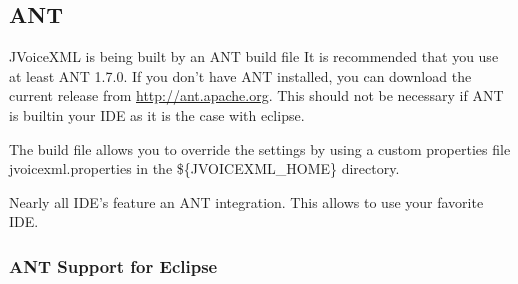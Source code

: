 \documentclass[11pt,a4paper]{article}
\begin{document}
\subsection{ANT}
\label{sec:ant}

JVoiceXML is being built by an ANT build file It is recommended that
you use at least ANT 1.7.0. 
If you don't have ANT installed, you can download the current release
from \url{http://ant.apache.org}. This should not be necessary if ANT is builtin
your IDE as it is the case with eclipse.

The build file allows you to override the settings by using a custom 
properties file jvoicexml.properties in the \$\{JVOICEXML\_HOME\}
directory.

Nearly all IDE's feature an ANT integration. This allows to use
your favorite IDE.

\subsubsection{ANT Support for Eclipse}
\label{sec:ant-eclipse}
\end{document}
